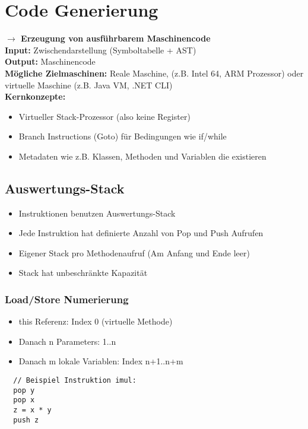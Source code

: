 
\section{Code Generierung}
\textbf{$\rightarrow$ Erzeugung von ausführbarem Maschinencode}\\
\textbf{Input:} Zwischendarstellung (Symboltabelle + AST)\\
\textbf{Output:} Maschinencode\\
\textbf{Mögliche Zielmaschinen:} Reale Maschine, (z.B. Intel 64, ARM Prozessor) oder virtuelle Maschine (z.B. Java VM, .NET CLI)\\
\textbf{Kernkonzepte:}
\begin{itemize}[topsep=0pt]
    \itemsep -0.2em
    \item Virtueller Stack-Prozessor (also keine Register)
    \item Branch Instructions (Goto) für Bedingungen wie if/while
    \item Metadaten wie z.B. Klassen, Methoden und Variablen die existieren
\end{itemize}
\subsection{Auswertungs-Stack}
\begin{itemize}[topsep=0pt]
    \itemsep -0.2em
    \item Instruktionen benutzen Auswertungs-Stack
    \item Jede Instruktion hat definierte Anzahl von Pop und Push Aufrufen
    \item Eigener Stack pro Methodenaufruf (Am Anfang und Ende leer)
    \item Stack hat unbeschränkte Kapazität
\end{itemize}

\begin{minipage}{0,5\linewidth}
    \subsubsection{Load/Store Numerierung}
    \begin{itemize}[topsep=0pt]
        \itemsep -0.2em
        \item this Referenz: Index 0 (virtuelle Methode)
        \item Danach n Parameters: 1..n
        \item Danach m lokale Variablen: Index n+1..n+m
    \end{itemize}
\end{minipage}
\begin{minipage}{0,5\linewidth}
    \begin{lstlisting}
  // Beispiel Instruktion imul:
  pop y
  pop x
  z = x * y
  push z
    \end{lstlisting}
\end{minipage}
